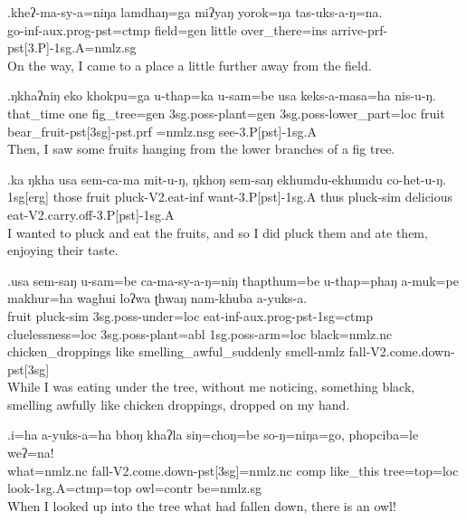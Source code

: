 \exg.kheʔ-ma-sy-a=niŋa                  lamdhaŋ=ga    miʔyaŋ yorok=ŋa        tas-uks-a-ŋ=na.\\
 go{\sc -inf-aux.prog-pst=ctmp} field{\sc =gen} little   over\_there{\sc =ins} arrive{\sc -prf-pst[3.P]-1sg.A=nmlz.sg}\\
On the way, I came to a place a little further away from the field.

\exg.ŋkhaʔniŋ eko khokpu=ga      u-thap=ka              u-sam=be                    usa   keks-a-masa=ha                               nis-u-ŋ.\\
 that\_time   one fig\_tree{\sc =gen} {\sc 3sg.poss-}plant{\sc =gen} {\sc 3sg.poss-}lower\_part{\sc =loc} fruit bear\_fruit{\sc -pst[3sg]-pst.prf =nmlz.nsg} see{\sc -3.P[pst]-1sg.A}\\
Then, I saw some fruits hanging from the lower branches of a fig tree.

\exg.ka  ŋkha usa   sem-ca-ma            mit-u-ŋ,               ŋkhoŋ sem-saŋ        ekhumdu-ekhumdu co-het-u-ŋ.\\
 {\sc 1sg[erg]} those fruit pluck{\sc -V2.eat-inf} want{\sc -3.P[pst]-1sg.A} thus    pluck{\sc -sim} delicious       eat{\sc -V2.carry.off-3.P[pst]-1sg.A}\\
I wanted to pluck and eat the fruits, and so I did pluck them and ate them, enjoying their taste.

\exg.usa   sem-saŋ u-sam=be  ca-ma-sy-a-ŋ=niŋ   thapthum=be  u-thap=phaŋ a-muk=pe    makhur=ha             waghui     loʔwa ʈhwaŋ     nam-khuba        a-yuks-a.\\
 fruit pluck{\sc -sim} {\sc 3sg.poss-}under{\sc =loc} eat{\sc -inf-aux.prog-pst-1sg=ctmp} cluelessness{\sc =loc} {\sc 3sg.poss-}plant{\sc =abl}  {\sc 1sg.poss-}arm{\sc =loc} black{\sc =nmlz.nc} chicken\_droppings like   smelling\_awful\_suddenly smell{\sc -nmlz} fall{\sc -V2.come.down-pst[3sg]}\\
While I was eating under the tree, without me noticing, something black, smelling awfully like chicken droppings, dropped on my hand.

\exg.i=ha                a-yuks-a=ha                                     bhoŋ khaʔla   siŋ=choŋ=be        so-ŋ=niŋa=go,              phopciba=le          weʔ=na!\\
 what{\sc =nmlz.nc} fall{\sc -V2.come.down-pst[3sg]=nmlz.nc} {\sc comp}  like\_this tree{\sc =top=loc} look{\sc -1sg.A=ctmp=top}  owl{\sc =contr} be{\sc [3sg]=nmlz.sg}\\
When I looked up into the tree what had fallen down, there is an owl!

